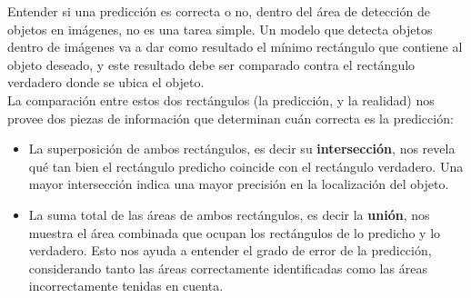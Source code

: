 \documentclass[a4paper]{article}
\begin{document}
\begin{figure}[H]
\end{figure}


Entender si una predicción es correcta o no, dentro del área de detección de objetos en imágenes, no es una tarea simple. Un modelo que detecta objetos dentro de imágenes va a dar como resultado el mínimo rectángulo que contiene al objeto deseado, y este resultado debe ser comparado contra el rectángulo verdadero donde se ubica el objeto.\\

La comparación entre estos dos rectángulos (la predicción, y la realidad) nos provee dos piezas de información que determinan cuán correcta es la predicción:

\begin{itemize}
\itemsep0em
    \item La superposición de ambos rectángulos, es decir su \textbf{intersección}, nos revela qué tan bien el rectángulo predicho coincide con el rectángulo verdadero. Una mayor intersección indica una mayor precisión en la localización del objeto.
    \item La suma total de las áreas de ambos rectángulos, es decir la \textbf{unión}, nos muestra el área combinada que ocupan los rectángulos de lo predicho y lo verdadero. Esto nos ayuda a entender el grado de error de la predicción, considerando tanto las áreas correctamente identificadas como las áreas incorrectamente tenidas en cuenta.
\end{itemize}
\end{document}
